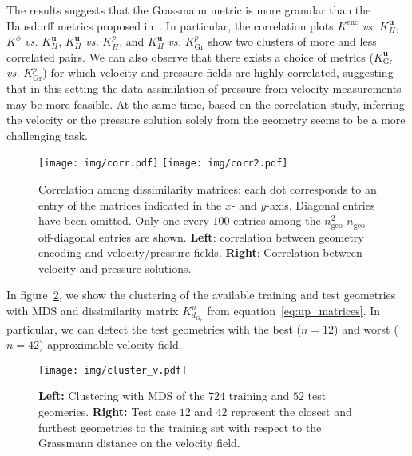 %
The results suggests that the Grassmann metric is more granular than the Hausdorff metrics proposed in~\cite{galarce2022state}. 
In particular, the correlation plots $K^{\text{enc}}$ \textit{vs.} $K^{\mathbf{u}}_{H}$, $K^{\phi}$ \textit{vs.} $K^{\mathbf{u}}_{H}$, 
$K^{\mathbf{u}}_{H}$ \textit{vs.} $K^{p}_{H}$, and $K^{\mathbf{u}}_{H}$ \textit{vs.} $K^{p}_{\text{Gr}}$ show two clusters of more and less correlated pairs. 
%
We can also observe that there exists a choice of metrics ($K^{\mathbf{u}}_{\text{Gr}}$ \textit{vs.} $K^{p}_{\text{Gr}}$) for which velocity and pressure fields 
are highly correlated, suggesting that in this setting the data assimilation of pressure from velocity measurements may be more feasible. 
At the same time, based on the correlation study, inferring the velocity or the pressure solution solely from the geometry seems to be a more challenging task.
%
\begin{figure}[!htp]
  \centering
  \texttt{[image: img/corr.pdf]}
  \texttt{[image: img/corr2.pdf]}
  \caption{Correlation among dissimilarity matrices: each dot corresponds to an entry of the matrices indicated in the $x$- and $y$-axis. 
Diagonal entries have been omitted.  Only one every $100$ entries among the $n_{\text{geo}}^2\text{-}n_{\text{geo}}$ off-diagonal entries are shown. 
\textbf{Left}: correlation between geometry encoding and velocity/pressure fields. \textbf{Right}: Correlation between velocity and pressure solutions.}
  \label{fig:mantel}
\end{figure}

In figure~\ref{fig:cluster_v}, we show the clustering of the available training and test geometries with MDS and dissimilarity matrix $K^{u}_{d_{G_r}}$ from equation~\eqref{eq:up_matrices}. In particular, we can detect the test geometries with the best ($n=12$) and worst ($n=42$) approximable velocity field.

\begin{figure}[!htp]
 \centering
 \texttt{[image: img/cluster\_v.pdf]}
 \caption{\textbf{Left: } Clustering with MDS of the $724$ training and $52$ test geomeries. \textbf{Right: }  Test case $12$ and $42$ represent the closest and furthest geometries to the training set with respect to the Grassmann distance on the velocity field.}
 \label{fig:cluster_v}
\end{figure}


